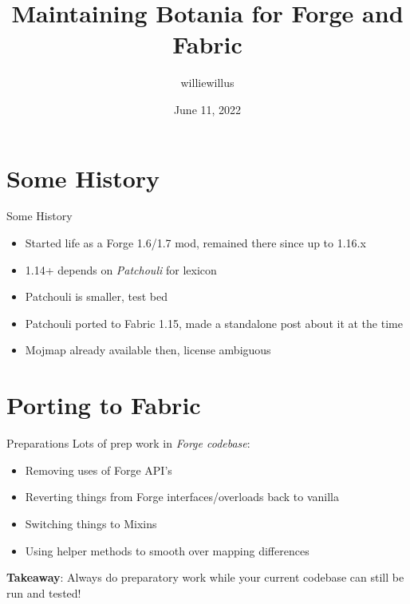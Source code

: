 \documentclass{beamer}
\title{Maintaining Botania for Forge and Fabric}
\date{June 11, 2022}
\author{williewillus}
\institute{Violet Moon Modding}
\begin{document}
\maketitle

\section{Some History}
\begin{frame}{Some History}
  \begin{itemize}
  \item Started life as a Forge 1.6/1.7 mod, remained there since up to 1.16.x
  \item 1.14+ depends on \textit{Patchouli} for lexicon
  \item Patchouli is smaller, test bed
  \item Patchouli ported to Fabric 1.15, made a standalone post about it at the time
  \item Mojmap already available then, license ambiguous
  \end{itemize}
\end{frame}

\section{Porting to Fabric}
\begin{frame}{Preparations}
  Lots of prep work in \textit{Forge codebase}:
  \begin{itemize}
  \item Removing uses of Forge API's
  \item Reverting things from Forge interfaces/overloads back to vanilla
  \item Switching things to Mixins
  \item Using helper methods to smooth over mapping differences
  \end{itemize}

  \textbf{Takeaway}: Always do preparatory work while your current codebase can still be
  run and tested!
\end{frame}
\end{document}
